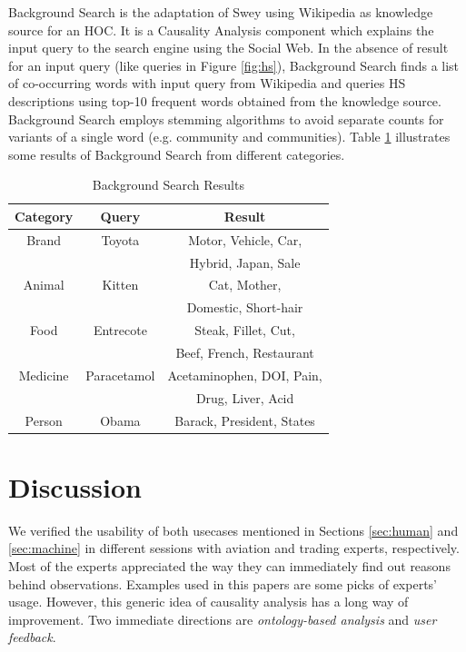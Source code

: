 \documentclass[conference]{IEEEtran}
\begin{document}
Background Search is the adaptation of {\sc Swey} using Wikipedia as knowledge source for an HOC. It is a Causality Analysis component which explains the input query to the search engine using the Social Web. In the absence of result for an input query (like queries in Figure \ref{fig:hs}), Background Search finds a list of co-occurring words with input query from Wikipedia and queries HS descriptions using top-10 frequent words obtained from the knowledge source. Background Search employs stemming algorithms \cite{jones1997readings} to avoid separate counts for variants of a single word (e.g. community and communities). Table \ref{tbl:bg} illustrates some results of Background Search from different categories.


\begin{table}
\centering
\begin{tabular}{|c|c|c|}
\hline
{\bf Category} & {\bf Query}  & {\bf Result} \\ \hline
Brand & Toyota & Motor, Vehicle, Car,\\
& & Hybrid, Japan, Sale\\ \hline
Animal & Kitten & Cat, Mother,\\
& & Domestic, Short-hair\\ \hline
Food & Entrecote & Steak, Fillet, Cut,\\
& & Beef, French, Restaurant\\ \hline
Medicine & Paracetamol & Acetaminophen, DOI, Pain,\\
& & Drug, Liver, Acid\\ \hline
Person & Obama & Barack, President, States\\ \hline
\end{tabular}
\caption{Background Search Results}
\label{tbl:bg}
\end{table}


\section{Discussion}
\label{sec:discussion} 
We verified the usability of both usecases mentioned in Sections \ref{sec:human} and \ref{sec:machine} in different sessions with aviation and trading experts, respectively. Most of the experts appreciated the way they can immediately find out reasons behind observations. Examples used in this papers are some picks of experts' usage. However, this generic idea of causality analysis has a long way of improvement. Two immediate directions are {\em ontology-based analysis} and {\em user feedback}.
\end{document}
